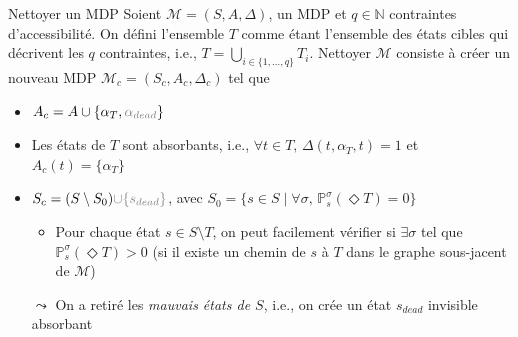 \documentclass[compress]{beamer}
\theoremstyle{theorem}%
\begin{document}
\begin{frame}{Nettoyer un MDP}
\footnotesize
  Soient $\mathcal{M} = (S, A, \Delta)$, un MDP et $q \in \mathbb{N}$ contraintes d'accessibilité. On défini l'ensemble $T$ comme étant l'ensemble des états cibles qui décrivent les $q$ contraintes, i.e., $T = \bigcup_{i \in \{1, \dots, q \}} T_i$. {\color{fibeamer@blue}Nettoyer $\mathcal{M}$ consiste à créer un nouveau MDP $\mathcal{M}_c = (S_c, A_c, \Delta_c)$ tel que}
  \begin{itemize}
    \item $A_c = A \cup \{\alpha_T, {\color{gray}\alpha_{dead}}\}$
    \item Les états de $T$ sont absorbants, i.e., $\forall t \in T, \,
      \Delta(t, \alpha_T, t) = 1$ et $A_c(t) = \{\alpha_T\}$
    \item $S_c = (S \setminus S_0) {\color{gray}\cup \{s_{dead}\}}$, avec
    $S_0 = \{ s \in S \; | \; \forall \sigma, \, \mathbb{P}^\sigma_s(\Diamond T) = 0 \}$
    \begin{itemize}
      \item {\scriptsize Pour chaque état $s \in S \setminus T$, on peut facilement vérifier si $\exists \sigma$ tel que
    $\mathbb{P}_s^\sigma (\Diamond T) > 0$ (si il existe un chemin de $s$ à $T$ dans le graphe sous-jacent de $\mathcal{M}$)}
    \end{itemize}
    \item[$\leadsto$] On a retiré les \textit{mauvais états de $S$}, i.e., on crée un état \alert{$s_{dead}$ invisible absorbant}
  \end{itemize}
\end{frame}
\end{document}
